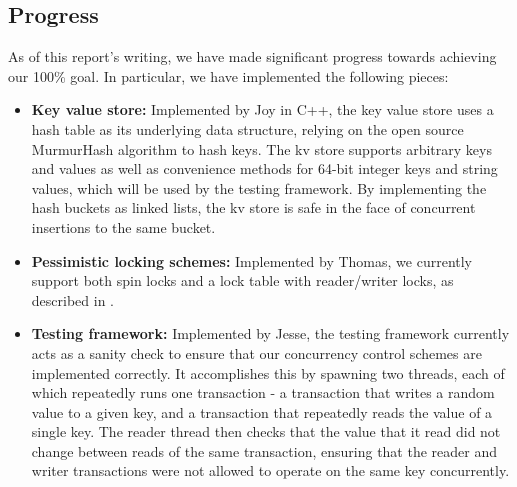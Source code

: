 \subsection{Progress}
As of this report's writing, we have made significant progress towards 
achieving our 100\% goal. In particular, we have implemented the following
pieces:
\begin{itemize}
\item \textbf{Key value store:} Implemented by Joy in C++, the key value store 
uses a hash table as its underlying data structure, relying on the open source
MurmurHash algorithm to hash keys. The kv store supports arbitrary keys and 
values as well as convenience methods for 64-bit integer keys and string 
values, which will be used by the testing framework. By implementing the hash 
buckets as linked lists, the kv store is safe in the face of concurrent 
insertions to the same bucket.
\item \textbf{Pessimistic locking schemes:} Implemented by Thomas, we currently 
support both spin locks and a lock table with reader/writer locks, as described 
in .
\item \textbf{Testing framework:} Implemented by Jesse, the testing framework 
currently acts as a sanity check to ensure that our concurrency control schemes 
are implemented correctly. It accomplishes this by spawning two threads, each 
of which repeatedly runs one transaction - a transaction that writes a random 
value to a given key, and a transaction that repeatedly reads the value of a 
single key. The reader thread then checks that the value that it read did not 
change between reads of the same transaction, ensuring that the reader and 
writer transactions were not allowed to operate on the same key concurrently.
\end{itemize}

